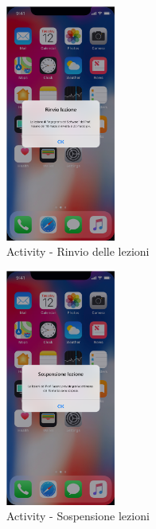 \begin{figure}
	\centering
	\includegraphics[width=0.32\textwidth]{imgs/gruppo2/activity-notifiche-rinvio-lezioni}
	\caption{Activity - Rinvio delle lezioni}
	\label{fig:activity-notifiche-rinvio-lezioni}
\end{figure}

\begin{figure}
	\centering
	\includegraphics[width=0.32\textwidth]{imgs/gruppo2/activity-notifiche-sospensione-lezioni}
	\caption{Activity - Sospensione lezioni}
	\label{fig:activity-notifiche-sospensione-lezioni}
\end{figure}

